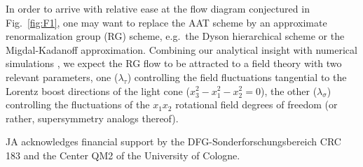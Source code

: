 \documentclass[aps,prl,twocolumn,letterpaper,superscriptaddress]{revtex4-2}
\begin{document}
In order to arrive with relative ease at the flow diagram conjectured in Fig.\ \ref{fig:F1}, one may want to replace the AAT scheme by an approximate renormalization group (RG) scheme, e.g.\ the Dyson hierarchical scheme or the Migdal-Kadanoff approximation. Combining our analytical insight with  numerical simulations \cite{Lemarie2022, SLS2022}, we expect the RG flow to be attracted to a field theory with two relevant parameters, one ($\lambda_\tau$) controlling the field fluctuations tangential to the Lorentz boost directions of the light cone ($x_3^2 - x_1^2 - x_2^2 = 0$), the other ($\lambda_\sigma$) controlling the fluctuations of the $x_1 x_2$ rotational field degrees of freedom (or rather, supersymmetry analogs thereof).

\smallskip{} JA acknowledges financial support by the DFG-Sonderforschungsbereich CRC 183 and the Center QM2 of the University of Cologne.
\end{document}
